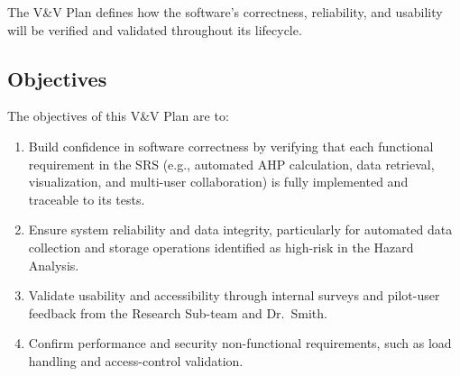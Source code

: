 \documentclass[12pt, titlepage]{article}
\begin{document}
The V\&V Plan defines how the software’s correctness, reliability, and usability
will be verified and validated throughout its lifecycle.

\subsection{Objectives}



The objectives of this V\&V Plan are to:

\begin{enumerate}
  \item Build confidence in software correctness by verifying that each
  functional requirement in the SRS (e.g., automated AHP calculation, data
  retrieval, visualization, and multi-user collaboration) is fully implemented
  and traceable to its tests.

  \item Ensure system reliability and data integrity, particularly for automated
  data collection and storage operations identified as high-risk in the Hazard
  Analysis.

  \item Validate usability and accessibility through internal surveys and
  pilot-user feedback from the Research Sub-team and Dr.~Smith.

  \item Confirm performance and security non-functional requirements, such as
  load handling and access-control validation.
\end{enumerate}
\end{document}
